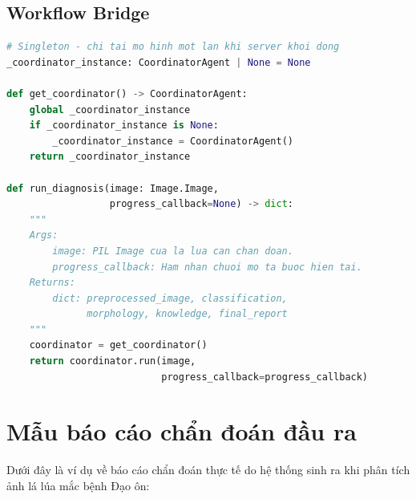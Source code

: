 \documentclass{uetgraduation}
\begin{document}
\section{Workflow Bridge}
\begin{lstlisting}[language=Python, caption={src/core/workflow.py --- Bridge giữa tầng UI/API và tầng Agent}, label={lst:workflow}]
# Singleton - chi tai mo hinh mot lan khi server khoi dong
_coordinator_instance: CoordinatorAgent | None = None

def get_coordinator() -> CoordinatorAgent:
    global _coordinator_instance
    if _coordinator_instance is None:
        _coordinator_instance = CoordinatorAgent()
    return _coordinator_instance

def run_diagnosis(image: Image.Image,
                  progress_callback=None) -> dict:
    """
    Args:
        image: PIL Image cua la lua can chan doan.
        progress_callback: Ham nhan chuoi mo ta buoc hien tai.
    Returns:
        dict: preprocessed_image, classification,
              morphology, knowledge, final_report
    """
    coordinator = get_coordinator()
    return coordinator.run(image,
                           progress_callback=progress_callback)
\end{lstlisting}

\chapter{Mẫu báo cáo chẩn đoán đầu ra}
\noindent Dưới đây là ví dụ về báo cáo chẩn đoán thực tế do hệ thống sinh ra khi phân tích ảnh lá lúa mắc bệnh Đạo ôn:
\end{document}
